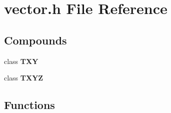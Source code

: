 \section{vector.h File Reference}
\label{vector.h}


\subsection*{Compounds}
\begin{CompactItemize}
\item 
class {\bf TXY}
\item 
class {\bf TXYZ}
\end{CompactItemize}
\subsection*{Functions}
